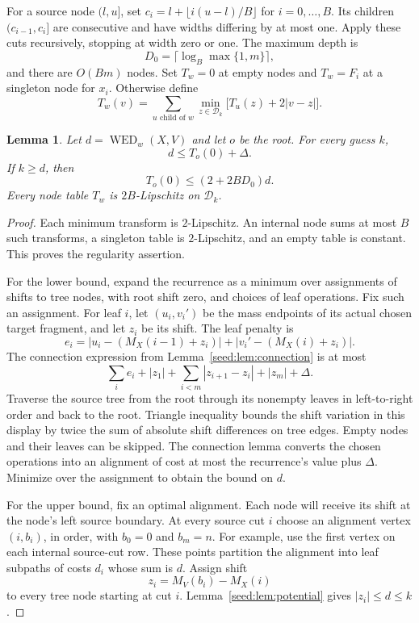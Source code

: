 \documentclass[11pt]{article}
\newtheorem{lemma}[theorem]{Lemma}
\theoremstyle{definition}
\newcommand{\WED}{\operatorname{WED}}
\newcommand{\1}{\mathbf 1}
\begin{document}
For a source node $(l,u]$, set $c_i=l+\lfloor i(u-l)/B\rfloor$
for $i=0,\ldots,B$. Its children $(c_{i-1},c_i]$ are consecutive
and have widths differing by at most one. Apply these cuts recursively,
stopping at width zero or one. The maximum
depth is
\[
 D_0=\lceil\log_B\max\{1,m\}\rceil,
\]
and there are $O(Bm)$ nodes. Set $T_w=0$ at empty nodes and $T_w=F_i$ at
a singleton node for $x_i$. Otherwise define
\[
 T_w(v)=\sum_{u\text{ child of }w}\min_{z\in\mathcal D_k}
                   \bigl[T_u(z)+2|v-z|\bigr].
\]
\begin{lemma}\label{seed:lem:tree}
Let $d=\WED_w(X,V)$ and let $o$ be the root. For every guess $k$,
\[
 d\le T_o(0)+\Delta.
\]
If $k\ge d$, then
\[
 T_o(0)\le (2+2BD_0)d.
\]
Every node table $T_w$ is $2B$-Lipschitz on $\mathcal D_k$.
\end{lemma}
\begin{proof}
Each minimum transform is $2$-Lipschitz. An internal node sums at most
$B$ such transforms, a singleton table is $2$-Lipschitz, and an empty
table is constant. This proves the regularity assertion.

For the lower bound, expand the recurrence as a minimum over assignments
of shifts to tree nodes, with root shift zero, and choices of leaf
operations. Fix such an assignment. For leaf $i$, let $(u_i,v_i')$ be the
mass endpoints of its actual chosen target fragment, and let $z_i$ be its
shift. The leaf penalty is
\[
 e_i=|u_i-(M_X(i-1)+z_i)|+|v_i'-(M_X(i)+z_i)|.
\]
The connection expression from Lemma~\ref{seed:lem:connection} is at most
\[
 \sum_i e_i+|z_1|+\sum_{i<m}|z_{i+1}-z_i|+|z_m|+\Delta.
\]
Traverse the source tree from the root through its nonempty leaves in
left-to-right order and back to the root. Triangle inequality bounds the
shift variation in this display by twice the sum of absolute shift
differences on tree edges. Empty nodes and their leaves can be skipped.
The connection lemma converts the chosen operations into an alignment
of cost at most the recurrence's value plus $\Delta$.
Minimize over the assignment to obtain the bound on $d$.

For the upper bound, fix an optimal alignment.
Each node will receive its shift at the node's left source boundary.
At every source cut $i$
choose an alignment vertex $(i,b_i)$, in order, with $b_0=0$ and $b_m=n$.
For example, use the first vertex on each internal source-cut row. These
points partition the alignment into leaf subpaths of costs $d_i$ whose
sum is $d$. Assign shift
\[
 z_i=M_V(b_i)-M_X(i)
\]
to every tree node starting at cut $i$. Lemma~\ref{seed:lem:potential} gives
$|z_i|\le d\le k$.


\end{proof}
\end{document}

